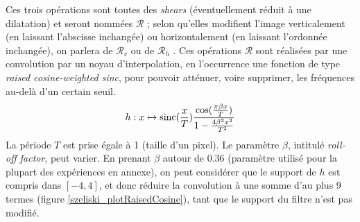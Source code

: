 	Ces trois opérations sont toutes des \emph{shears} (éventuellement réduit à une dilatation) et seront nommées $\mathcal R$ ; selon qu'elles modifient l'image verticalement (en laissant l'abscisse inchangée) ou horizontalement (en laissant l'ordonnée inchangée), on parlera de $\mathcal R_v$ ou de $\mathcal R_h$ . Ces opérations $\mathcal R$ sont réalisées par une convolution par un noyau d'interpolation, en l'occurrence une fonction de type \emph{raised cosine-weighted sinc}, pour pouvoir atténuer, voire supprimer, les fréquences au-delà d'un certain seuil.
	\begin{equation}
	h : x \mapsto \operatorname{sinc}(\frac{x}{T})\frac{\cos(\frac{\pi\beta x}{T})}{1-\frac{4\beta^2x^2}{T^2}}
	\label{szeliski_definition_raisedCosineWeightedSinc}
	\end{equation}
	La période $T$ est prise égale à 1 (taille d'un pixel).
	Le paramètre $\beta$, intitulé \emph{roll-off factor}, peut varier. En prenant $\beta$ autour de $0.36$ (paramètre utilisé pour la plupart des expériences en annexe), on peut considérer que le support de $h$ est compris dans $[-4,4]$, et donc réduire la convolution à une somme d'au plus 9 termes (figure \ref{szeliski_plotRaisedCosine}), tant que le support du filtre n'est pas modifié.
	\label{label_figure_dom_reel_fourier_jt}

